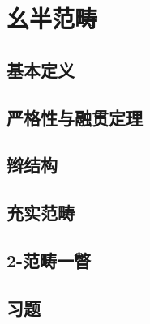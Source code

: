 \chapter{幺半范畴}

\section{基本定义}
\section{严格性与融贯定理}
\section{辫结构}
\section{充实范畴}
\section{2-范畴一瞥}
\section{习题}
